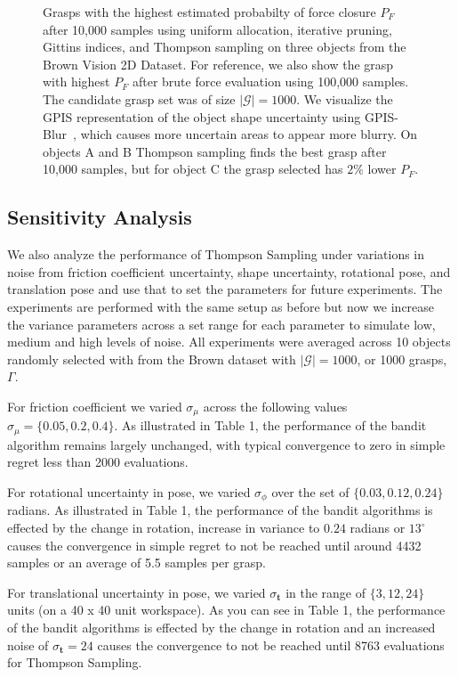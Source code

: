 \documentclass[10pt, conference]{ieeeconf}      %
\newcommand{\bt}{\mathbf{t}}
\newcommand{\mG}{\mathcal{G}}
\begin{document}
\begin{figure}%
\label{fig:shape_examples}
    \centering
    \caption{Grasps with the highest estimated probabilty of force closure $P_F$ after 10,000 samples using uniform allocation, iterative pruning, Gittins indices, and Thompson sampling on three objects from the Brown Vision 2D Dataset. For reference, we also show the grasp with highest $P_F$ after brute force evaluation using 100,000 samples. The candidate grasp set was of size $|\mG|=1000$. We visualize the GPIS representation of the object shape uncertainty using GPIS-Blur~\cite{mahler2015gp}, which causes more uncertain areas to appear more blurry.  On objects A and B Thompson sampling finds the best grasp after 10,000 samples, but for object C the grasp selected has $2\%$ lower $P_F$.}%
    \label{fig:shape_samples}%
\end{figure}


\subsection{Sensitivity Analysis }\label{sec:sensitivity}
We also analyze the performance of Thompson Sampling under variations in noise from friction coefficient uncertainty, shape uncertainty, rotational pose, and translation pose and use that to set the parameters for future experiments.
The experiments are performed with the same setup as before but now we increase the variance parameters across a set range for each parameter to simulate low, medium and high levels of noise.
All experiments were averaged across 10 objects randomly selected with from the Brown dataset with $|\mG| = 1000$, or 1000 grasps, $\Gamma$. 

For friction coefficient we varied $\sigma_{\mu}$ across the following values $\sigma_{\mu} = \lbrace 0.05, 0.2, 0.4 \rbrace$.
As illustrated in Table 1, the performance of the bandit algorithm remains largely unchanged, with typical convergence to zero in simple regret less than 2000 evaluations.

For rotational uncertainty in pose, we varied $\sigma_{\phi}$ over the set of $\lbrace 0.03, 0.12,0.24\rbrace$ radians. As illustrated in Table 1, the performance of the bandit algorithms is effected by the change in rotation, increase in variance to $0.24$ radians or $13^{\circ}$  causes the convergence in simple regret to not be reached until around 4432 samples or an average of 5.5 samples per grasp. 

For translational uncertainty in pose, we varied $\sigma_{\bt}$ in the range of $\lbrace 3,12, 24 \rbrace$ units (on a 40 x 40 unit workspace). As you can see in Table 1, the performance of the bandit algorithms is effected by the change in rotation and an increased noise of $\sigma_{\bt} = 24$ causes the convergence to not be reached until 8763 evaluations for Thompson Sampling. 
\end{document}
